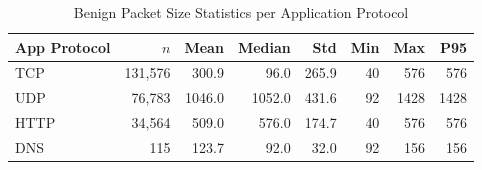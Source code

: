 \begin{table}[htbp]
\centering
\caption{Benign Packet Size Statistics per Application Protocol}\label{tab:benign_app_proto_stats}
\begin{tabular}{lrrrrrrr}
\toprule
\textbf{App Protocol} & \textbf{$n$} & \textbf{Mean} & \textbf{Median} & \textbf{Std} & \textbf{Min} & \textbf{Max} & \textbf{P95} \\
\midrule
TCP & 131,576 & 300.9 & 96.0 & 265.9 & 40 & 576 & 576 \\
UDP & 76,783 & 1046.0 & 1052.0 & 431.6 & 92 & 1428 & 1428 \\
HTTP & 34,564 & 509.0 & 576.0 & 174.7 & 40 & 576 & 576 \\
DNS & 115 & 123.7 & 92.0 & 32.0 & 92 & 156 & 156 \\
\bottomrule
\end{tabular}
\end{table}
